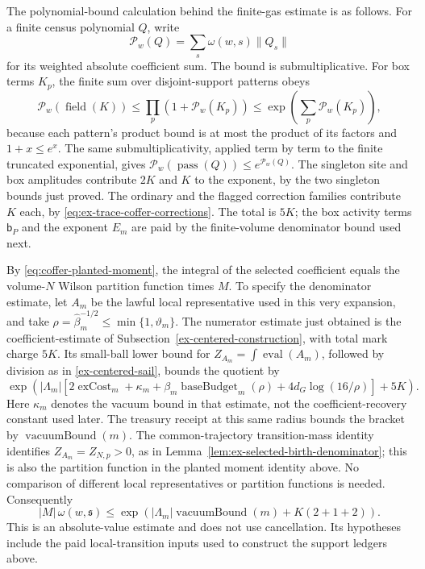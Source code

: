 The polynomial-bound calculation behind the finite-gas estimate is as
follows. For a finite census polynomial \(Q\), write
\[
 \mathcal P_w(Q)=\sum_s\omega(w,s)\|Q_s\|
\]
for its weighted absolute coefficient sum. The bound is submultiplicative.
For box terms \(K_p\), the finite sum over disjoint-support patterns obeys
\[
 \mathcal P_w(\operatorname{field}(K))
 \leq\prod_p(1+\mathcal P_w(K_p))
 \leq\exp\!\left(\sum_p\mathcal P_w(K_p)\right),
\]
because each pattern's product bound is at most the product of its factors
and \(1+x\leq e^x\). The same submultiplicativity, applied term by term to
the finite truncated exponential, gives
\(\mathcal P_w(\operatorname{pass}(Q))\leq e^{\mathcal P_w(Q)}\).
The singleton site and box amplitudes contribute \(2K\) and \(K\) to the
exponent, by the two singleton bounds just proved. The
ordinary and the flagged correction families contribute \(K\) each, by
\eqref{eq:ex-trace-coffer-corrections}. The total is \(5K\); the box
activity terms \(\mathsf b_P\) and the exponent \(E_m\) are paid by the
finite-volume denominator bound used next.

By \eqref{eq:coffer-planted-moment}, the integral of the selected coefficient
equals the volume-$N$ Wilson partition function times $M$.
To specify the denominator estimate, let $A_m$ be the lawful local
representative used in this very expansion, and take
$\rho=\widehat\beta_m^{-1/2}\le\min\{1,\vartheta_m\}$.
The numerator estimate just obtained is the coefficient-estimate
of Subsection~\ref{ex-centered-construction}, with total mark charge $5K$.
Its small-ball lower bound for $Z_{A_m}=\int\operatorname{eval}(A_m)$,
followed by division as in \eqref{ex-centered-sail}, bounds the quotient
by
\[
 \exp\!\left(|\Lambda_m|\left[2\operatorname{exCost}_m+
 \kappa_m+\beta_m\operatorname{baseBudget}_m(\rho)
 +4d_G\log(16/\rho)\right]+5K\right).
\]
Here $\kappa_m$ denotes the vacuum bound in that estimate, not the
coefficient-recovery constant used later. The treasury receipt at this
same radius bounds the bracket by $\operatorname{vacuumBound}(m)$.
The common-trajectory transition-mass identity identifies
$Z_{A_m}=Z_{N,p}>0$, as in
Lemma~\ref{lem:ex-selected-birth-denominator}; this is also the partition
function in the planted moment identity above. No comparison of
different local representatives or partition functions is needed.
Consequently
\begin{equation}
 |M|\,\omega(w,\mathfrak s)
 \leq \exp\!\left(|\Lambda_m|\operatorname{vacuumBound}(m)
                         +K(2+1+2)\right).
 \label{eq:ex-trace-spiker}
\end{equation}
This is an absolute-value estimate and does not use cancellation. Its hypotheses include the paid local-transition inputs used to construct
the support ledgers above.

